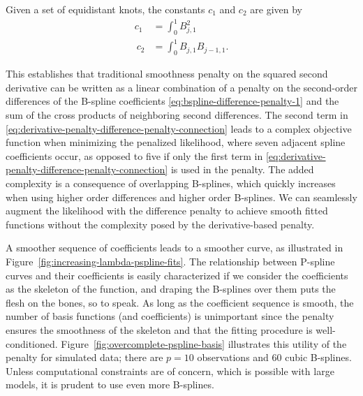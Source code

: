 \noindent
Given a set of equidistant knots, the constants $c_1$ and $c_2$ are given by
\begin{equation}
\begin{split}
c_1 & =   \int_0^1 B_{j,1}^2\\\
c_2 & = \int_0^1 B_{j,1}B_{j-1,1}.
\end{split}
\end{equation}


This establishes that traditional smoothness penalty on the squared second derivative can be written as a linear combination of a penalty on the second-order differences of the B-spline coefficients \ref{eq:bspline-difference-penalty-1} and the sum of the cross products of neighboring second differences. The second term in \ref{eq:derivative-penalty-difference-penalty-connection} leads to a complex objective function when minimizing the penalized likelihood, where seven adjacent spline coefficients occur, as opposed to five if only the first term in \ref{eq:derivative-penalty-difference-penalty-connection} is used in the penalty. The added complexity is a consequence of overlapping B-splines, which quickly increases when using higher order differences and higher order B-splines. We can seamlessly augment the likelihood with the difference penalty to achieve smooth fitted functions without the complexity posed by the derivative-based penalty.

\bigskip

A smoother sequence of coefficients leads to a smoother curve, as illustrated in Figure~\ref{fig:increasing-lambda-pspline-fits}.  The relationship between P-spline curves and their coefficients is easily characterized if we consider the coefficients as the skeleton of the function, and draping the B-splines over them puts the flesh on the bones, so to speak. As long as the coefficient sequence is smooth, the number of basis functions (and coefficients) is unimportant since the penalty ensures the smoothness of the skeleton and that the fitting procedure is well-conditioned.  Figure~\ref{fig:overcomplete-pspline-basis} illustrates this utility of the penalty for simulated data; there are $p=10$ observations and $60$ cubic B-splines. Unless computational constraints are of concern, which is possible with large models, it is prudent to use even more B-splines.  

